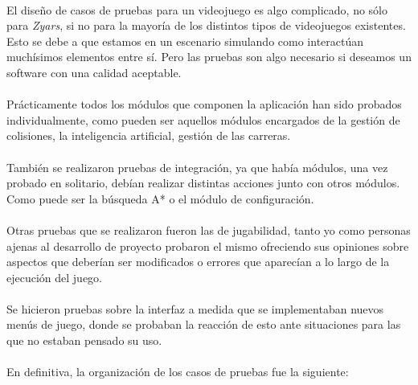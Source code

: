 
\paragraph{}
El diseño de casos de pruebas para un videojuego es algo complicado, no sólo para \emph{Zyars}, si no para la mayoría de los
distintos tipos de videojuegos existentes. Esto se debe a que estamos en un
escenario simulando como interactúan muchísimos 
elementos entre sí. Pero las pruebas son algo necesario si deseamos un software con una calidad aceptable.

\paragraph{}
Prácticamente todos los módulos que componen la aplicación han sido probados individualmente, como pueden ser aquellos módulos 
encargados de la gestión de colisiones, la inteligencia artificial, gestión de las carreras.

\paragraph{}
También se realizaron pruebas de integración, ya que había módulos, una vez probado en solitario, debían realizar distintas acciones 
junto con otros módulos. Como puede ser la búsqueda A* o el módulo de configuración.

\paragraph{}
Otras pruebas que se realizaron fueron las de jugabilidad, tanto yo como
personas ajenas al desarrollo de proyecto probaron el 
mismo ofreciendo sus opiniones sobre aspectos que deberían ser modificados o
errores que aparecían a lo largo de la ejecución
del juego.

\paragraph{}
Se hicieron pruebas sobre la interfaz a medida que se implementaban nuevos menús de juego, donde se probaban
la reacción de esto ante situaciones para las que no estaban pensado su uso.

\paragraph{}
En definitiva, la organización de los casos de pruebas fue la siguiente:

